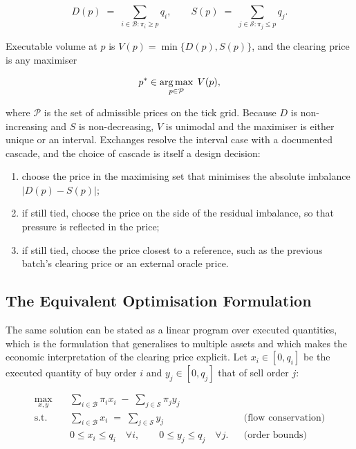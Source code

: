 \begin{equation}
D(p) \;=\; \sum_{i \in \mathcal{B} : \pi_i \geq p} q_i,
\qquad
S(p) \;=\; \sum_{j \in \mathcal{S} : \pi_j \leq p} q_j .
\label{eq:demandsupply}
\end{equation}

Executable volume at $p$ is $V(p) = \min\{D(p), S(p)\}$, and the
clearing price is any maximiser

\begin{equation}
p^{\ast} \in \operatorname*{arg\,max}_{p \in \mathcal{P}} \; V(p),
\label{eq:clearing}
\end{equation}

where $\mathcal{P}$ is the set of admissible prices on the tick grid.
Because $D$ is non-increasing and $S$ is non-decreasing, $V$ is
unimodal and the maximiser is either unique or an interval. Exchanges
resolve the interval case with a documented cascade, and the choice of
cascade is itself a design decision:

\begin{enumerate}
  \item choose the price in the maximising set that minimises the
  absolute imbalance $|D(p) - S(p)|$;
  \item if still tied, choose the price on the side of the residual
  imbalance, so that pressure is reflected in the price;
  \item if still tied, choose the price closest to a reference, such as
  the previous batch's clearing price or an external oracle price.
\end{enumerate}

\subsection{The Equivalent Optimisation Formulation}

The same solution can be stated as a linear program over executed
quantities, which is the formulation that generalises to multiple assets
and which makes the economic interpretation of the clearing price
explicit. Let $x_i \in [0, q_i]$ be the executed quantity of buy order
$i$ and $y_j \in [0, q_j]$ that of sell order $j$:

\begin{align}
\max_{x, y} \quad & \sum_{i \in \mathcal{B}} \pi_i x_i \;-\; \sum_{j \in \mathcal{S}} \pi_j y_j
\label{eq:lpobj}\\
\text{s.t.} \quad & \sum_{i \in \mathcal{B}} x_i \;=\; \sum_{j \in \mathcal{S}} y_j
&& \text{(flow conservation)} \label{eq:lpflow}\\
& 0 \leq x_i \leq q_i \quad \forall i, \qquad
  0 \leq y_j \leq q_j \quad \forall j.
&& \text{(order bounds)} \label{eq:lpbounds}
\end{align}

